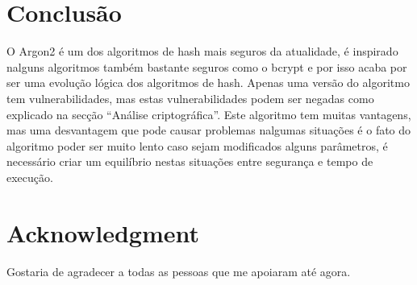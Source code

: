 \documentclass[conference]{IEEEtran}
\begin{document}
\section{Conclusão}

O Argon2 é um dos algoritmos de hash mais seguros da atualidade, é inspirado nalguns algoritmos também bastante seguros 
como o bcrypt e por isso acaba por ser uma evolução lógica dos algoritmos de hash.
Apenas uma versão do algoritmo tem vulnerabilidades, mas estas vulnerabilidades podem ser negadas como explicado na 
secção “Análise criptográfica”. Este algoritmo tem muitas vantagens, mas uma desvantagem que pode causar 
problemas nalgumas situações é o fato do algoritmo poder ser muito lento caso sejam modificados alguns parâmetros, 
é necessário criar um equilíbrio nestas situações entre segurança e tempo de execução.

\section*{Acknowledgment}

Gostaria de agradecer a todas as \cite{rfc9106} pessoas que me apoiaram até agora.



\end{document}
